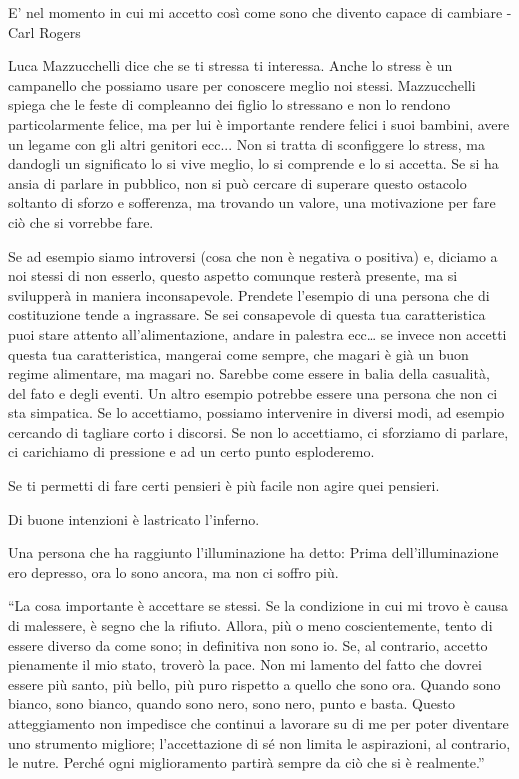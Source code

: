 \documentclass[12pt]{book} %
\begin{document}
E' nel momento in cui mi accetto così come sono che divento capace di cambiare - Carl Rogers

Luca Mazzucchelli dice che se ti stressa ti interessa. Anche lo stress è un campanello che possiamo usare per conoscere
meglio noi stessi. Mazzucchelli spiega che le feste di compleanno dei figlio lo stressano e non lo rendono
particolarmente felice, ma per lui è importante rendere felici i suoi bambini, avere un legame con gli altri genitori
ecc... Non si tratta di sconfiggere lo stress, ma dandogli un significato lo si vive meglio, lo si comprende e lo si
accetta. Se si ha ansia di parlare in pubblico, non si può cercare di superare questo ostacolo soltanto di sforzo e
sofferenza, ma trovando un valore, una motivazione per fare ciò che si vorrebbe fare.

Se ad esempio siamo introversi (cosa che non è negativa o positiva) e, diciamo a noi stessi di non esserlo, questo
aspetto comunque resterà presente, ma si svilupperà in maniera inconsapevole. Prendete l'esempio
di una persona che di costituzione tende a ingrassare. Se sei consapevole di questa tua caratteristica puoi stare
attento all'alimentazione, andare in palestra ecc… se invece non accetti questa tua
caratteristica, mangerai come sempre, che magari è già un buon regime alimentare, ma magari no. Sarebbe come essere in
balia della casualità, del fato e degli eventi. Un altro esempio potrebbe essere una persona che non ci sta simpatica.
Se lo accettiamo, possiamo intervenire in diversi modi, ad esempio cercando di tagliare corto i discorsi. Se non lo
accettiamo, ci sforziamo di parlare, ci carichiamo di pressione e ad un certo punto esploderemo.

Se ti permetti di fare certi pensieri è più facile non agire quei pensieri.

Di buone intenzioni è lastricato l'inferno.

Una persona che ha raggiunto l'illuminazione ha detto: Prima dell'illuminazione ero depresso, ora
lo sono ancora, ma non ci soffro più. 

“La cosa importante è accettare se stessi. Se la condizione in cui mi trovo è causa di malessere, è segno che la
rifiuto. Allora, più o meno coscientemente, tento di essere diverso da come sono; in definitiva non sono io. Se, al
contrario, accetto pienamente il mio stato, troverò la pace. Non mi lamento del fatto che dovrei essere più santo, più
bello, più puro rispetto a quello che sono ora. Quando sono bianco, sono bianco, quando sono nero, sono nero, punto e
basta. Questo atteggiamento non impedisce che continui a lavorare su di me per poter diventare uno strumento migliore;
l'accettazione di sé non limita le aspirazioni, al contrario, le nutre. Perché ogni miglioramento
partirà sempre da ciò che si è realmente.” 
\end{document}
